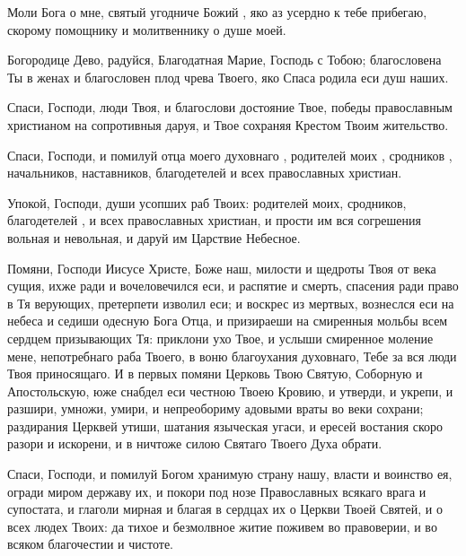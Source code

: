 \begin{mymulticols}

Моли Бога о мне, святый угодниче Божий , яко аз усердно к тебе прибегаю, скорому помощнику и молитвеннику о душе моей.


Богородице Дево, радуйся, Благодатная Марие, Господь с Тобою; благословена Ты в женах и благословен плод чрева Твоего, яко Спаса родила еси душ наших.


Спаси, Господи, люди Твоя, и благослови достояние Твое, победы православным христианом на сопротивныя даруя, и Твое сохраняя Крестом Твоим жительство.


Спаси, Господи, и помилуй отца моего духовнаго , родителей моих , сродников , начальников, наставников, благодетелей  и всех православных христиан.


Упокой, Господи, души усопших раб Твоих: родителей моих, сродников, благодетелей , и всех православных христиан, и прости им вся согрешения вольная и невольная, и даруй им Царствие Небесное.



Помяни, Господи Иисусе Христе, Боже наш, милости и щедроты Твоя от века сущия, ихже ради и вочеловечился еси, и распятие и смерть, спасения ради право в Тя верующих, претерпети изволил еси; и воскрес из мертвых, вознеслся еси на небеса и седиши одесную Бога Отца, и призираеши на смиренныя мольбы всем сердцем призывающих Тя: приклони ухо Твое, и услыши смиренное моление мене, непотребнаго раба Твоего, в воню благоухания духовнаго, Тебе за вся люди Твоя приносящаго. И в первых помяни Церковь Твою Святую, Соборную и Апостольскую, юже снабдел еси честною Твоею Кровию, и утверди, и укрепи, и разшири, умножи, умири, и непреобориму адовыми враты во веки сохрани; раздирания Церквей утиши, шатания языческая угаси, и ересей востания скоро разори и искорени, и в ничтоже силою Святаго Твоего Духа обрати. 

Спаси, Господи, и помилуй Богом хранимую страну нашу, власти и воинство ея, огради миром державу их, и покори под нозе Православных всякаго врага и супостата, и глаголи мирная и благая в сердцах их о Церкви Твоей Святей, и о всех людех Твоих: да тихое и безмолвное житие поживем во правоверии, и во всяком благочестии и чистоте. 


\end{mymulticols}
